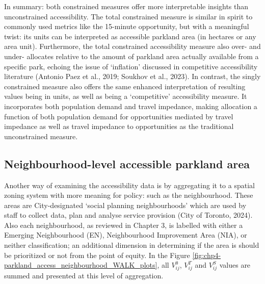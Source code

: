 \documentclass[
11pt, %
oneside, %
english, %
singlespacing, %
]{macthesis} %
\begin{document}
In summary: both constrained measures offer more interpretable insights than unconstrained accessibility. The total constrained measure is similar in spirit to commonly used metrics like the 15-minute opportunity, but with a meaningful twist: its units can be interpreted as accessible parkland area (in hectares or any area unit). Furthermore, the total constrained accessibility measure also over- and under- allocates relative to the amount of parkland area actually available from a specific park, echoing the issue of `inflation' discussed in competitive accessibility literature (Antonio Paez et al., 2019; Soukhov et al., 2023). In contrast, the singly constrained measure also offers the same enhanced interpretation of resulting values being in units, as well as being a `competitive' accessibility measure. It incorporates both population demand and travel impedance, making allocation a function of both population demand for opportunities mediated by travel impedance as well as travel impedance to opportunities as the traditional unconstrained measure.

\subsection{Neighbourhood-level accessible parkland area}\label{neighbourhood-level-accessible-parkland-area}

Another way of examining the accessibility data is by aggregating it to a spatial zoning system with more meaning for policy: such as the neighbourhood. These areas are City-designated `social planning neighbourhoods' which are used by staff to collect data, plan and analyse service provision (City of Toronto, 2024). Also each neighbourhood, as reviewed in Chapter 3, is labelled with either a Emerging Neighbourhood (EN), Neighbourhood Improvement Area (NIA), or neither classification; an additional dimension in determining if the area is should be prioritized or not from the point of equity. In the Figure \ref{fig:chp4-parkland_access_neighbourhood_WALK_plots}, all \(V^0_{ij}\), \(V^T_{ij}\) and \(V^S_{ij}\) values are summed and presented at this level of aggregation.
\end{document}
